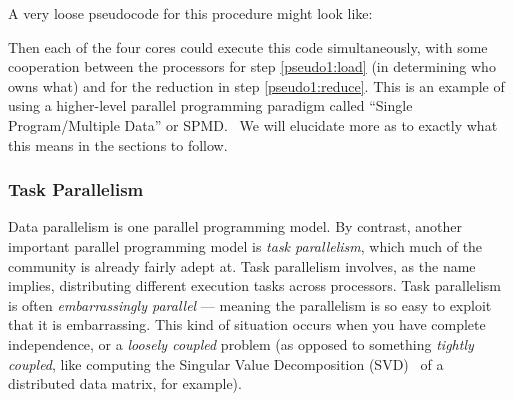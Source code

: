 A very loose pseudocode for this procedure might look like:


Then each of the four cores could execute this code simultaneously, with some cooperation between the processors for step \ref{pseudo1:load} (in determining who owns what) and for the reduction in step \ref{pseudo1:reduce}.  This is an example of using a higher-level parallel programming paradigm called ``Single Program/Multiple Data'' or SPMD.~  We will elucidate more as to exactly what this means in the sections to follow.



\subsubsection{Task Parallelism}

Data parallelism is one parallel programming model.  By contrast, another important parallel programming model is \emph{task parallelism}, which much of the  community is already fairly adept at.  Task parallelism involves, as the name implies, distributing different execution tasks across processors.  Task parallelism is often \emph{embarrassingly parallel} --- meaning the parallelism is so easy to exploit that it is embarrassing.  This kind of situation occurs when you have complete independence, or a \emph{loosely coupled} problem (as opposed to something \emph{tightly coupled}, like computing the Singular Value Decomposition
(SVD)~ of a distributed data matrix, for example).  

